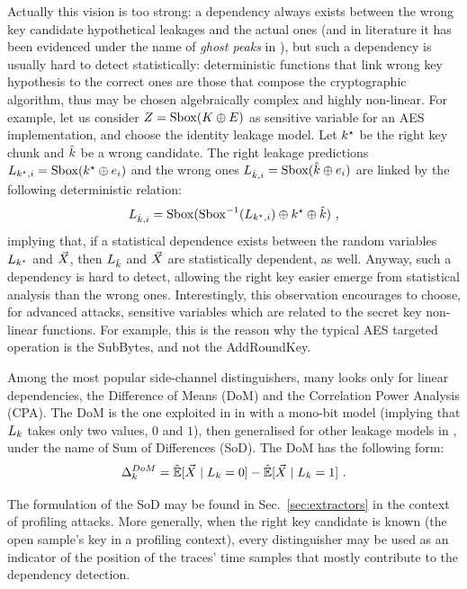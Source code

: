 \begin{remark}\label{rem:ghost}
Actually this vision is too strong: a dependency always exists between the wrong key candidate hypothetical leakages and the actual ones (and in literature it has been evidenced under the name of \emph{ghost peaks} in \cite{brier2004correlation}), but such a dependency is usually hard to detect statistically: deterministic functions that link wrong key hypothesis to the correct ones are those that compose the cryptographic algorithm, thus may be chosen algebraically complex and highly non-linear. For example, let us consider $Z = \mathrm{Sbox}(K \oplus E)$ as sensitive variable for an AES implementation, and choose the identity leakage model. Let $k^\star$ be the right key chunk and $\hat{k}$ be a wrong candidate. The right leakage predictions $L_{k^\star, i} = \mathrm{Sbox}(k^\star \oplus e_i)$ and the wrong ones $L_{\hat{k}, i} = \mathrm{Sbox}(\hat{k} \oplus e_i)$ are linked by the following deterministic relation: 
\begin{equation*}
L_{\hat{k}, i} = \mathrm{Sbox}(\mathrm{Sbox}^{-1}(L_{k^\star, i})\oplus k^\star \oplus \hat{k}) \mbox{ ,}
\end{equation*}
implying that, if a statistical dependence exists between the random variables $L_{k^\star}$ and $\vec{X}$, then $L_{\hat{k}}$ and $\vec{X}$ are statistically dependent, as well. Anyway, such a dependency is hard to detect, allowing the right key easier emerge from statistical analysis than the wrong ones. Interestingly, this observation encourages to choose, for advanced attacks, sensitive variables which are related to the secret key \via non-linear functions. For example, this is the reason why the typical AES targeted operation is the SubBytes, and not the AddRoundKey.
\end{remark}

Among the most popular side-channel distinguishers, many looks only for linear dependencies, \eg the Difference of Means (DoM) and the Correlation Power Analysis (CPA). The DoM is the one exploited in in \cite{kocher1999differential} with a mono-bit model (implying that $L_k$ takes only two values, $0$ and $1$), then generalised for other leakage models in \cite{Rechberger2005}, under the name of Sum of Differences (SoD). The DoM has the following form: 
\begin{equation}
\distinguisher^{DoM}_{\keyVar} = \esperEst[\given{\vaLeakVec}{\leakageModel_\keyVar = 0}] - \esperEst[\given{\vaLeakVec}{\leakageModel_\keyVar = 1}]   \mbox{ .}
\end{equation}
\begin{remark}
The formulation of the SoD may be found in Sec.~\ref{sec:extractors} in the context of profiling attacks. More generally, when the right key candidate is known (\eg the open sample's key in a profiling context), every distinguisher may be used as an indicator of the position of the traces' time samples that mostly contribute to the dependency detection.
\end{remark}

